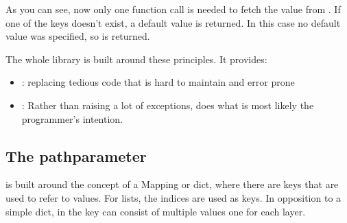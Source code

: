 \documentclass[a4paper,10pt,english]{sphinxmanual}
\begin{document}
\begin{sphinxVerbatim}[commandchars=\\\{\},numbers=left,firstnumber=1,stepnumber=1]
   
     
\end{sphinxVerbatim}

\sphinxAtStartPar
As you can see, now only one function call is needed to fetch the value from . If one of the keys doesn’t exist, a default value is returned. In this case no default value was specified, so  is returned.

\sphinxAtStartPar
The whole  library is built around these principles. It provides:
\begin{itemize}
\item {}
\sphinxAtStartPar
{}: replacing tedious code that is hard to maintain and error prone

\item {}
\sphinxAtStartPar
{}: Rather than raising a lot of exceptions,  does what is most likely the programmer’s intention.

\end{itemize}


\subsection{The path\sphinxhyphen{}parameter}
\label{\detokenize{README:the-path-parameter}}
\sphinxAtStartPar
{} is built around the concept of a Mapping or dict, where there are keys that are used to refer to values. For lists, the indices are used as keys. In opposition to a simple dict, in  the key can consist of multiple values \textendash{} one for each layer.
\end{document}
